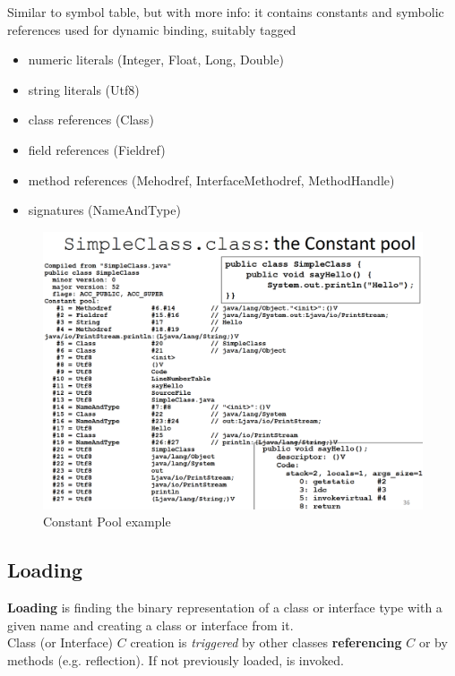 \begin{paracol}{2}
    
    Similar to symbol table, but with more info: it contains constants and symbolic references used for
    dynamic binding, suitably tagged
    \begin{itemize}
        \item numeric literals (Integer, Float, Long, Double)
        \item string literals (Utf8)
        \item class references (Class)
        \item field references (Fieldref)
        \item method references (Mehodref, InterfaceMethodref, MethodHandle)
        \item signatures (NameAndType)
    \end{itemize}
    
    \switchcolumn

    \begin{figure}[htbp]
        \centering
        \includegraphics[width=0.9\columnwidth]{images/jvm_pool.png}
        \caption{Constant Pool example}
        \label{fig:jvm_pool}
    \end{figure}

\end{paracol}

\subsection{Loading}
\textbf{Loading} is finding the binary representation of a class or interface type with a given name and creating a class or interface from it.\\
Class (or Interface) $C$ creation is \textit{triggered} by other classes \textbf{referencing} $C$ or by methods (e.g. reflection).
If not previously loaded,  is invoked.
\nl

